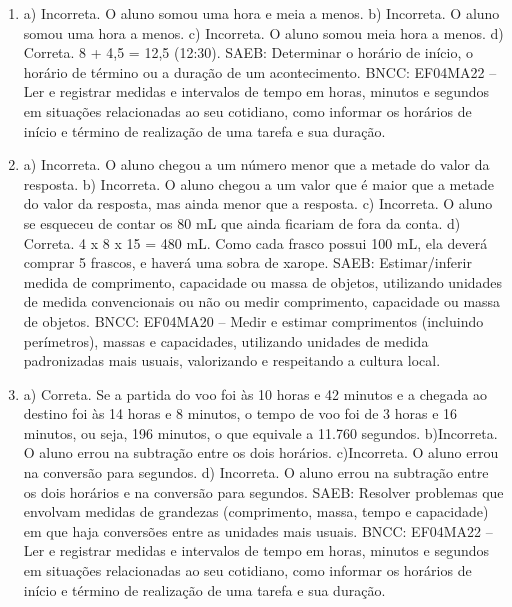 \begin{enumerate}
\item
a) Incorreta. O aluno somou uma hora e meia a menos.
b) Incorreta. O aluno somou uma hora a menos.
c) Incorreta. O aluno somou meia hora a menos.
d) Correta. 8 + 4,5 = 12,5 (12:30).
SAEB: Determinar o horário de início, o horário de término ou a duração de um acontecimento.
BNCC: EF04MA22 -- Ler e registrar medidas e intervalos de tempo em horas, minutos e segundos em
situações relacionadas ao seu cotidiano, como informar os horários de início e término de realização
de uma tarefa e sua duração.

\item
a) Incorreta. O aluno chegou a um número menor que a metade do valor da resposta.
b) Incorreta. O aluno chegou a um valor que é maior que a metade do valor da resposta, mas ainda menor que a resposta.
c) Incorreta. O aluno se esqueceu de contar os 80 mL que ainda ficariam de fora da conta.
d) Correta. 4 x 8 x 15 = 480 mL. Como cada frasco possui 100 mL, ela deverá
comprar 5 frascos, e haverá uma sobra de xarope.
SAEB: Estimar/inferir medida de comprimento, capacidade ou massa de objetos, utilizando unidades de medida convencionais ou não ou medir comprimento, capacidade ou massa de objetos.
BNCC: EF04MA20 -- Medir e estimar comprimentos (incluindo perímetros), massas e capacidades, utilizando
unidades de medida padronizadas mais usuais, valorizando e respeitando a cultura local.

\item
a) Correta. Se a partida do voo foi às 10 horas e 42 minutos e a chegada ao destino foi às 14 horas e 8 minutos, o tempo de voo foi de 3 horas e 16 minutos, ou seja, 196 minutos, o que equivale a 11.760 segundos.
b)Incorreta. O aluno errou na subtração entre os dois horários.
c)Incorreta. O aluno errou na conversão para segundos.
d) Incorreta. O aluno errou na subtração entre os dois horários e na conversão para segundos.
SAEB: Resolver problemas que envolvam medidas de grandezas (comprimento, massa, tempo e capacidade) em que haja conversões entre as unidades mais usuais.
BNCC: EF04MA22 -- Ler e registrar medidas e intervalos de tempo em horas, minutos e segundos em
situações relacionadas ao seu cotidiano, como informar os horários de início e término de realização
de uma tarefa e sua duração.
\end{enumerate}



